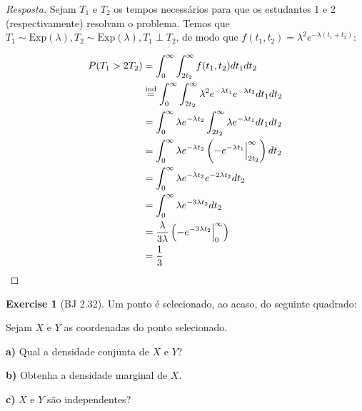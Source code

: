 \documentclass[
]{article}
\theoremstyle{definition}
\theoremstyle{definition}
\theoremstyle{definition}
\newtheorem{exercise}{Exercise}[section]
\theoremstyle{definition}
\theoremstyle{remark}
\begin{document}
\begin{proof}[Resposta]
Sejam \(T_{1}\) e \(T_{2}\) os tempos necessários para que os estudantes 1 e 2 (respectivamente) resolvam o problema. Temos que \(T_{1} \sim \mathrm{Exp}(\lambda),T_{2} \sim \mathrm{Exp}(\lambda), T_{1} \perp T_{2}\), de modo que \(f(t_{1},t_{2}) = \lambda^{2}e^{-\lambda(t_{1} + t_{2})}\):

\begin{align*}
P(T_{1} > 2T_{2}) &= \int_{0}^{\infty}\int_{2t_{2}}^{\infty}f(t_{1},t_{2})dt_{1}dt_{2} \\
&\stackrel{\text{ind}}{=} \int_{0}^{\infty}\int_{2t_{2}}^{\infty}\lambda^{2}e^{-\lambda t_{1}}e^{-\lambda t_{2}}dt_{1}dt_{2} \\
&= \int_{0}^{\infty}\lambda e^{-\lambda t_{2}}\int_{2t_{2}}^{\infty}\lambda e^{-\lambda t_{1}}dt_{1}dt_{2} \\
&= \int_{0}^{\infty}\lambda e^{-\lambda t_{2}}\left(-e^{-\lambda t_{1}}\Big{|}_{2t_{2}}^{\infty}\right)dt_{2} \\
&= \int_{0}^{\infty}\lambda e^{-\lambda t_{2}}e^{-2\lambda t_{2}}dt_{2} \\
&= \int_{0}^{\infty}\lambda e^{-3\lambda t_{2}}dt_{2} \\
&= \frac{\lambda}{3\lambda}\left(-e^{-3\lambda t_{2}}\Big{|}_{0}^{\infty}\right) \\
&= \frac{1}{3}
\end{align*}
\end{proof}

\begin{exercise}[BJ 2.32]
Um ponto é selecionado, ao acaso, do seguinte quadrado:

\begin{center}
\end{center}

Sejam \(X\) e \(Y\) as coordenadas do ponto selecionado.

\textbf{a)} Qual a densidade conjunta de \(X\) e \(Y\)?

\textbf{b)} Obtenha a densidade marginal de \(X\).

\textbf{c)} \(X\) e \(Y\) são independentes?
\end{exercise}
\end{document}
